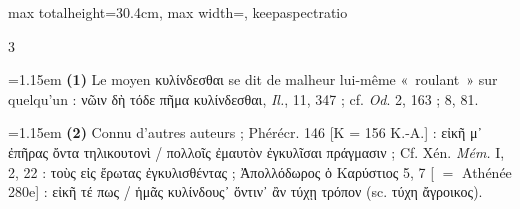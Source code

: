 \documentclass[11pt,twoside]{book}
\newcommand{\italique}[1]{\textit{#1}}
\begin{document}
\begin{adjustbox}{max totalheight=30.4cm, max width=\textwidth, keepaspectratio}
\begin{minipage}{\textwidth}
{\begin{multicols}{3}
\par\vspace{1.5pt}
\par\vspace{1.2pt}\par\nopagebreak\vspace{1pt}\noindent\hangindent=1.15em {\color{sepiaNote}\textbf{(1)}} Le moyen κυλίνδεσθαι se dit de malheur lui-même «~roulant~» sur quelqu'un : νῶιν δὴ τόδε πῆμα κυλίνδεσθαι, \italique{Il.}, 11, 347 ; cf. \italique{Od}. 2, 163 ; 8, 81.
\par\vspace{1.5pt}
\noindent\hangindent=1.15em {\color{sepiaNote}\textbf{(2)}} Connu d'autres auteurs ; Phérécr. 146 [K = 156 K.-A.] : εἰκῆ μ᾿ ἐπῆρας ὄντα τηλικουτονὶ / πολλοῖς ἐμαυτὸν ἐγκυλῖσαι πράγμασιν ; Cf. Xén. \italique{Mém.} I, 2, 22 : τοὺς εἰς ἔρωτας ἐγκυλισθέντας ; Ἀπολλόδωρος ὁ Καρύστιος 5, 7 [ $=$ Athénée 280e] : εἰκῆ τέ πως / ἡμᾶς κυλίνδους᾽ ὅντιν᾽ ἂν τύχῃ τρόπον (sc. τύχη ἄγροικος).
\par\vspace{1.5pt}

\end{multicols}}
\end{minipage}
\end{adjustbox}
\end{document}
